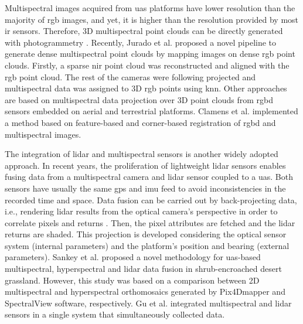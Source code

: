 Multispectral images acquired from \acrshort{uas} platforms have lower resolution than the majority of \acrshort{rgb} images, and yet, it is higher than the resolution provided by most \acrshort{ir} sensors. Therefore, 3D multispectral point clouds can be directly generated with photogrammetry \cite{liu_registration_2018, zainuddin_3d_2019, shen_estimation_2019, villacres_construction_2022, comba_unsupervised_2018}. Recently, Jurado et al. \cite{jurado_multispectral_2020} proposed a novel pipeline to generate dense multispectral point clouds by mapping images on dense \acrshort{rgb} point clouds. Firstly, a sparse \acrshort{nir} point cloud was reconstructed and aligned with the \acrshort{rgb} point cloud. The rest of the cameras were following projected and multispectral data was assigned to 3D \acrshort{rgb} points using \acrshort{knn}. Other approaches are based on multispectral data projection over 3D point clouds from \acrshort{rgbd} sensors embedded on aerial and terrestrial platforms. Clamens et al. \cite{clamens_real-time_2021} implemented a method based on feature-based and corner-based registration of \acrshort{rgbd} and multispectral images.

The integration of \acrshort{lidar} and multispectral sensors is another widely adopted approach. In recent years, the proliferation of lightweight \acrshort{lidar} sensors enables fusing data from a multispectral camera and \acrshort{lidar} sensor coupled to a \acrshort{uas}. Both sensors have usually the same \acrshort{gps} and \acrshort{imu} feed to avoid inconsistencies in the recorded time and space. Data fusion can be carried out by back-projecting data, i.e., rendering \acrshort{lidar} results from the optical camera’s perspective in order to correlate pixels and returns \cite{valbuena_integrating_2014}. Then, the pixel attributes are fetched and the \acrshort{lidar} returns are shaded. This projection is developed considering the optical sensor system (internal parameters) and the platform's position and bearing (external parameters). Sankey et al. \cite{sankey_quantifying_2021} proposed a novel methodology for \acrshort{uas}-based multispectral, hyperspectral and \acrshort{lidar} data fusion in shrub-encroached desert grassland. However, this study was based on a comparison between 2D multispectral and hyperspectral orthomosaics generated by Pix4Dmapper and SpectralView software, respectively. Gu et al. \cite{gu_uav-based_2020} integrated multispectral and \acrshort{lidar} sensors in a single system that simultaneously collected data. 

